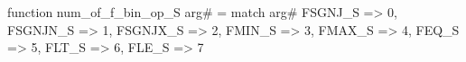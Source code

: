 function num_of_f_bin_op_S arg# = match arg# {
  FSGNJ_S => 0,
  FSGNJN_S => 1,
  FSGNJX_S => 2,
  FMIN_S => 3,
  FMAX_S => 4,
  FEQ_S => 5,
  FLT_S => 6,
  FLE_S => 7
}
